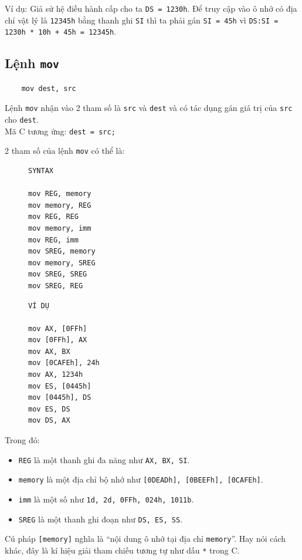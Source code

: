 \documentclass[12pt]{report}
\newcommand{\code}[1]{\texttt{#1}}
\begin{document}
Ví dụ: Giả sử hệ điều hành cấp cho ta \code{DS = 1230h}.
Để truy cập vào ô nhớ có địa chỉ vật lý là \code{12345h} bằng thanh ghi \code{SI} thì ta phải gán \code{SI = 45h} vì \code{DS:SI = 1230h * 10h + 45h = 12345h}.

\subsection{Lệnh \code{mov}}
\begin{verbatim}
    mov dest, src
\end{verbatim}
Lệnh \code{mov} nhận vào 2 tham số là \code{src} và \code{dest} và có tác dụng gán giá trị của \code{src} cho \code{dest}.\\
Mã C tương ứng: \code{dest = src;}

2 tham số của lệnh \code{mov} có thể là:
\begin{figure}[H]
    \begin{minipage}{0.5\textwidth}
\begin{verbatim}
SYNTAX 

mov REG, memory
mov memory, REG
mov REG, REG
mov memory, imm
mov REG, imm
mov SREG, memory
mov memory, SREG 
mov SREG, SREG 
mov SREG, REG
\end{verbatim}
    \end{minipage}
    \hfill
        \begin{minipage}{0.5\textwidth}
\begin{verbatim}
VÍ DỤ 

mov AX, [0FFh]
mov [0FFh], AX
mov AX, BX
mov [0CAFEh], 24h
mov AX, 1234h
mov ES, [0445h]
mov [0445h], DS 
mov ES, DS 
mov DS, AX
\end{verbatim}         
         \end{minipage}
\end{figure}

Trong đó:
\begin{itemize}
    \item \code{REG} là một thanh ghi đa năng như \code{AX, BX, SI}.
    \item \code{memory} là một địa chỉ bộ nhớ như \code{[0DEADh], [0BEEFh], [0CAFEh]}.
    \item \code{imm} là một số như \code{1d, 2d, 0FFh, 024h, 1011b}.
    \item \code{SREG} là một thanh ghi đoạn như \code{DS, ES, SS}.
\end{itemize}

Cú pháp \code{[memory]} nghĩa là ``nội dung ô nhớ tại địa chỉ \code{memory}''. Hay nói cách khác, đây là kí hiệu giải tham chiếu tương tự như dấu \code{*} trong C.
\end{document}
